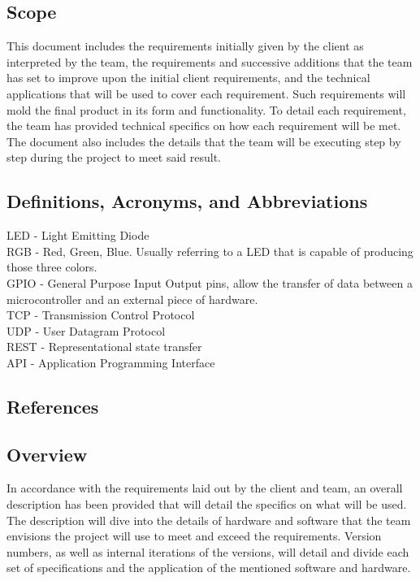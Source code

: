 \documentclass[onecolumn, draftclsnofoot,10pt, compsoc]{IEEEtran}
\begin{document}
		\subsection{Scope}
			This document includes the requirements initially given by the client as interpreted by the team, the requirements and successive additions that the team has set to improve upon the initial client requirements, and the technical applications that will be used to cover each requirement.  Such requirements will mold the final product in its form and functionality.
			To detail each requirement, the team has provided technical specifics on how each requirement will be met.  The document also includes the details that the team will be executing step by step
			during the project to meet said result.

		\subsection{Definitions, Acronyms, and Abbreviations}
			LED - Light Emitting Diode \\
			RGB - Red, Green, Blue. Usually referring to a LED that is capable of producing those three colors. \\
			GPIO - General Purpose Input Output pins, allow the transfer of data between a microcontroller and an external piece of hardware. \\
			TCP - Transmission Control Protocol \\
			UDP - User Datagram Protocol \\
			REST - Representational state transfer \\
			API - Application Programming Interface \\

		\subsection{References}
		
		


		\subsection{Overview}
			In accordance with the requirements laid out by the client and team, an overall description has been provided that will detail the specifics on what will be used.  The description will dive into
			the details of hardware and software that the team envisions the project will use to meet and exceed the requirements.  Version numbers, as well as internal iterations of the versions, will detail
			and divide each set of specifications and the application of the mentioned software and hardware.
\end{document}

